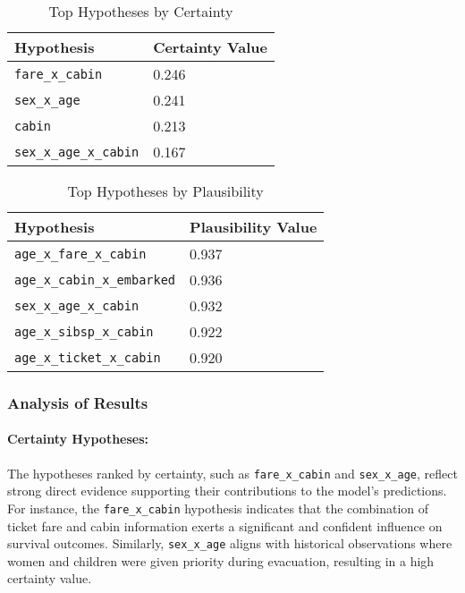 \documentclass[acmlarge]{acmart}
\begin{document}
\begin{table}[H]
    \caption{Top Hypotheses by Certainty}
    \label{tab:top_certainty}
    \centering
    \begin{tabularx}{\textwidth}{|Y|Y|}
        \hline
        \textbf{Hypothesis} & \textbf{Certainty Value} \\
        \hline
        \texttt{fare\_x\_cabin} & 0.246 \\
        \texttt{sex\_x\_age} & 0.241 \\
        \texttt{cabin} & 0.213 \\
        \texttt{sex\_x\_age\_x\_cabin} & 0.167 \\
        \hline
    \end{tabularx}
\end{table}

\begin{table}[H]
    \caption{Top Hypotheses by Plausibility}
    \label{tab:top_plausibility}
    \centering
    \begin{tabularx}{\textwidth}{|Y|Y|}
        \hline
        \textbf{Hypothesis} & \textbf{Plausibility Value} \\
        \hline
        \texttt{age\_x\_fare\_x\_cabin} & 0.937 \\
        \texttt{age\_x\_cabin\_x\_embarked} & 0.936 \\
        \texttt{sex\_x\_age\_x\_cabin} & 0.932 \\
        \texttt{age\_x\_sibsp\_x\_cabin} & 0.922 \\
        \texttt{age\_x\_ticket\_x\_cabin} & 0.920 \\
        \hline
    \end{tabularx}
\end{table}

\subsubsection{Analysis of Results}

\paragraph{Certainty Hypotheses:}
The hypotheses ranked by certainty, such as \texttt{fare\_x\_cabin} and \texttt{sex\_x\_age}, reflect strong direct evidence supporting their contributions to the model's predictions. For instance, the \texttt{fare\_x\_cabin} hypothesis indicates that the combination of ticket fare and cabin information exerts a significant and confident influence on survival outcomes. Similarly, \texttt{sex\_x\_age} aligns with historical observations where women and children were given priority during evacuation, resulting in a high certainty value.
\end{document}
